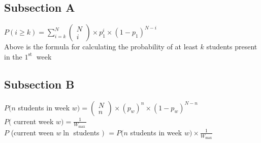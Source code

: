 \documentclass[a4paper,11pt]{article}
\theoremstyle{mytheor}
\begin{document}
\subsection{Subsection A}
$P(i \geqslant k)=\sum_{i=k}^N\left(\begin{array}{c}N \\ i\end{array}\right) \times p_1^i \times\left(1-p_1\right)^{N-i}$\\
Above is the formula for calculating the probability of at least $k$ students present in the $1^{\text {st }}$ week

\subsection{Subsection B}
$P(n$ students in week $w)=\left(\begin{array}{c}N \\ n\end{array}\right) \times\left(p_w\right)^n \times\left(1-p_w\right)^{N-n}$\\
$P($ current week $w)=\frac{1}{W_{\text {max }}}$\\
$P$ (current ween $w \ln$ students $)$
$=P(n$ students in week $w) \times \frac{1}{W_{\max }}$
\end{document}
